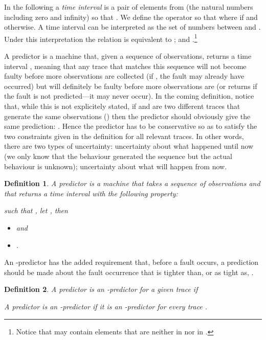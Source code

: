 \documentclass{article}
\newtheorem{defi}{Definition}
\begin{document}
In the following a \emph{time interval} is a pair of elements  
from  
(the natural numbers including zero and infinity) 
so that .  
We define the operator  
so that  
where  if  
and  otherwise.  
A time interval  can be interpreted 
as the set of numbers between  and .  
Under this interpretation 
the relation  
is equivalent to ; 
and .\footnote{Notice that  may contain elements 
that are neither in  nor in .}

A predictor is a machine  that, given a sequence  of observations, 
returns a time interval , 
meaning that any trace that matches this sequence 
will not become faulty before  more observations are collected 
(if , the fault may already have occurred) 
but will definitely be faulty before  more observations are 
(or returns  if the fault is not predicted---it may never occur).  
In the coming definition, 
notice that, while this is not explicitely stated, 
if  and  are two different traces 
that generate the same observations () 
then the predictor should obviously give the same prediction: 
.  
Hence the predictor has to be conservative 
so as to satisfy the two constraints given in the definition 
for all relevant traces.  
In other words, there are two types of uncertainty: 
uncertainty about what happened until now 
(we only know that the behaviour generated the sequence  
but the actual behaviour is unknown); 
uncertainty about what will happen from now.  

\begin{defi}\label{defi::predictor}
  A \emph{predictor} is a machine  
  that takes a sequence of observations 
  and that returns a time interval 
  with the following property: 
   
  such that , 
  let , then 
  \begin{itemize}
  \item 
     and 
  \item 
    .  
  \end{itemize}
\end{defi}

An -predictor has the added requirement 
that, before a fault occurs, 
a prediction should be made about the fault occurrence 
that is tighter than, or as tight as, .  

\begin{defi}\label{defi::ijpredictor}
  A predictor  is an \emph{-predictor
  for a given trace } if 
  

  A predictor is an \emph{-predictor} 
  if it is an -predictor for every trace .  
\end{defi}
\end{document}
